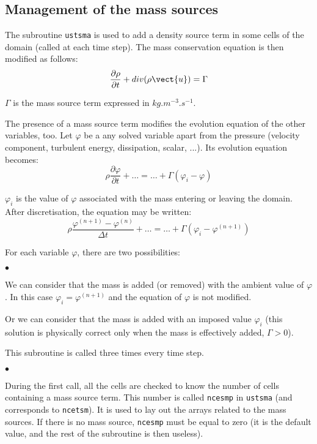 {{{%
\subsection{Management of the mass sources}

The subroutine \texttt{ustsma} is used to add a density source term in some cells of
the domain (called at each time step). The mass conservation equation is then modified as follows:
\begin{displaymath}
\frac{\partial \rho}{\partial t} + div(\rho\vect{u})=\Gamma
\end{displaymath}

$\Gamma$ is the mass source term expressed in $kg.m^{-3}.s^{-1}$.

The presence of a mass source term modifies the evolution equation of
the other variables, too. Let $\varphi$ be a any solved variable apart
from the pressure (velocity component, turbulent energy, dissipation,
scalar, ...). Its evolution equation becomes:
\begin{displaymath}
\rho\frac{\partial \varphi}{\partial t} + \ldots = \ldots + \Gamma(\varphi_i-\varphi)
\end{displaymath}

$\varphi_i$ is the value of $\varphi$ associated with the mass entering
or leaving the domain. After discretisation, the equation may be written:
\begin{displaymath}
\rho\frac{\varphi^{(n+1)}-\varphi^{(n)}}{\Delta t} + \ldots
= \ldots + \Gamma(\varphi_i-\varphi^{(n+1)})
\end{displaymath}

For each variable $\varphi$, there are two possibilities:
\begin{list}{$\bullet$}{}
\item We can consider that the mass is added (or removed) with the
      ambient value of $\varphi$. In this case
      $\varphi_i=\varphi^{(n+1)}$ and the equation of $\varphi$ is not
      modified.
\item Or we can consider that the mass is added with an
      imposed value $\varphi_i$ (this solution is physically correct
      only when the mass is effectively added, $\Gamma>0$).
\end{list}

\bigskip

This subroutine is called three times every time step.

\begin{list}{$\bullet$}{}
\item During the first call, all the cells are checked to know the
      number of cells containing a mass source term.
      This number is called \texttt{ncesmp} in
      \texttt{ustsma} (and corresponds to
      \texttt{ncetsm}). It is used to lay out the arrays
      related to the mass sources. If there is no mass source,
      \texttt{ncesmp} must be equal to zero (it is the default value, and the
      rest of the subroutine is then useless).


\end{list}}}}
